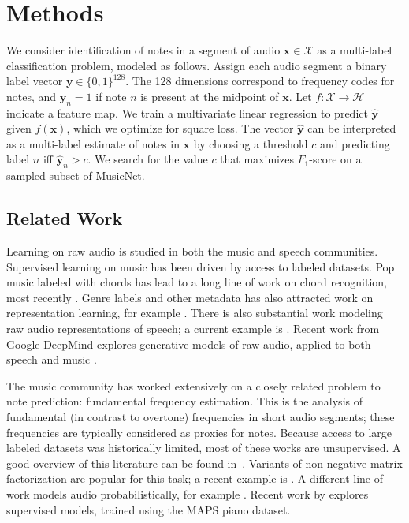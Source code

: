 \documentclass{article} \usepackage{iclr2017_conference,times}
\begin{document}
 \section{Methods}

We consider identification of notes in a segment of audio $\mathbf{x} \in \mathcal{X}$ as a multi-label classification problem, modeled as follows. Assign each audio segment a binary label vector $\mathbf{y} \in \{0,1\}^{128}$. The 128 dimensions correspond to frequency codes for notes, and $\mathbf{y}_n = 1$ if note $n$ is present at the midpoint of $\mathbf{x}$. Let $f : \mathcal{X} \to \mathcal{H}$ indicate a feature map. We train a multivariate linear regression to predict $\mathbf{\hat y}$ given $f(\mathbf{x})$, which we optimize for square loss. The vector $\mathbf{\hat y}$ can be interpreted as a multi-label estimate of notes in $\mathbf{x}$ by choosing a threshold $c$ and predicting label $n$ iff $\mathbf{\hat y}_n > c$. We search for the value $c$ that maximizes $F_1$-score on a sampled subset of MusicNet.

\subsection{Related Work}

Learning on raw audio is studied in both the music and speech communities. Supervised learning on music has been driven by access to labeled datasets. Pop music labeled with chords \citep{harte} has lead to a long line of work on chord recognition, most recently \cite{chords}. Genre labels and other metadata has also attracted work on representation learning, for example \cite{dieleman}. There is also substantial work modeling raw audio representations of speech; a current example is \cite{rawspeech}. Recent work from Google DeepMind explores generative models of raw audio, applied to both speech and music \citep{wavenet}.

The music community has worked extensively on a closely related problem to note prediction: fundamental frequency estimation. This is the analysis of fundamental (in contrast to overtone) frequencies in short audio segments; these frequencies are typically considered as proxies for notes. Because access to large labeled datasets was historically limited, most of these works are unsupervised. A good overview of this literature can be found in~\cite{klapuri}. Variants of non-negative matrix factorization are popular for this task; a recent example is \cite{nmf}. A different line of work models audio probabilistically, for example \cite{kirkpatrick}. Recent work by \cite{kelz16} explores supervised models, trained using the MAPS piano dataset.
\end{document}
